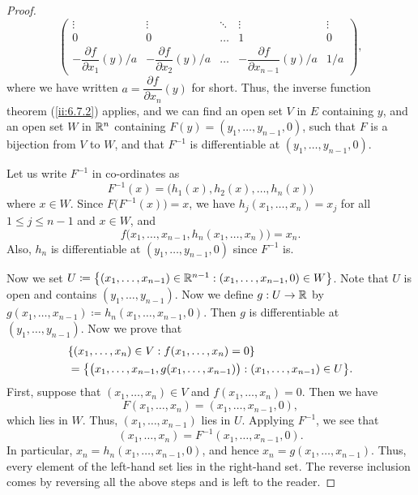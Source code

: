 \begin{proof}
\[\begin{pmatrix}
      \vdots                                   & \vdots                                   & \ddots & \vdots                                         & \vdots \\
      0                                        & 0                                        & \dots  & 1                                              & 0      \\
      -\dfrac{\partial f}{\partial x_1}(y) / a & -\dfrac{\partial f}{\partial x_2}(y) / a & \dots  & -\dfrac{\partial f}{\partial x_{n - 1}}(y) / a & 1 / a
    \end{pmatrix},
  \]
  where we have written \(a = \dfrac{\partial f}{\partial x_n}(y)\) for short.
  Thus, the inverse function theorem (\cref{ii:6.7.2}) applies, and we can find an open set \(V\) in \(E\) containing \(y\), and an open set \(W\) in \(\mathbb{R}^n\) containing \(F(y) = (y_1, \dots, y_{n - 1}, 0)\), such that \(F\) is a bijection from \(V\) to \(W\), and that \(F^{-1}\) is differentiable at \((y_1, \dots, y_{n - 1}, 0)\).

  Let us write \(F^{-1}\) in co-ordinates as
  \[
    F^{-1}(x) = \big(h_1(x), h_2(x), \dots, h_n(x)\big)
  \]
  where \(x \in W\).
  Since \(F\big(F^{-1}(x)\big) = x\), we have \(h_j(x_1, \dots, x_n) = x_j\) for all \(1 \leq j \leq n - 1\) and \(x \in W\), and
  \[
    f\big(x_1, \dots, x_{n - 1}, h_n(x_1, \dots, x_n)\big) = x_n.
  \]
  Also, \(h_n\) is differentiable at \((y_1, \dots, y_{n - 1}, 0)\) since \(F^{-1}\) is.

  Now we set \(U \coloneqq \left\lbrace(x_1, \dots, x_{n - 1}) \in \mathbb{R}^{n - 1} : (x_1, \dots, x_{n - 1}, 0) \in W\right\rbrace\).
  Note that \(U\) is open and contains \((y_1, \dots, y_{n - 1})\).
  Now we define \(g : U \to \mathbb{R}\) by \(g(x_1, \dots, x_{n - 1}) \coloneqq h_n(x_1, \dots, x_{n - 1}, 0)\).
  Then \(g\) is differentiable at \((y_1, \dots, y_{n - 1})\).
  Now we prove that
  \begin{align*}
     & \set{(x_1, \dots, x_n) \in V : f(x_1, \dots, x_n) = 0}                                             \\
     & = \set{\big(x_1, \dots, x_{n - 1}, g(x_1, \dots, x_{n - 1})\big) : (x_1, \dots, x_{n - 1}) \in U}.
  \end{align*}
  First, suppose that \((x_1, \dots, x_n) \in V\) and \(f(x_1, \dots, x_n) = 0\).
  Then we have
  \[
    F(x_1, \dots, x_n) = (x_1, \dots, x_{n - 1}, 0),
  \]
  which lies in \(W\).
  Thus, \((x_1, \dots, x_{n - 1})\) lies in \(U\).
  Applying \(F^{-1}\), we see that
  \[
    (x_1, \dots, x_n) = F^{-1}(x_1, \dots, x_{n - 1}, 0).
  \]
  In particular, \(x_n = h_n(x_1, \dots, x_{n - 1}, 0)\), and hence \(x_n = g(x_1, \dots, x_{n - 1})\).
  Thus, every element of the left-hand set lies in the right-hand set.
  The reverse inclusion comes by reversing all the above steps and is left to the reader.


\end{proof}

